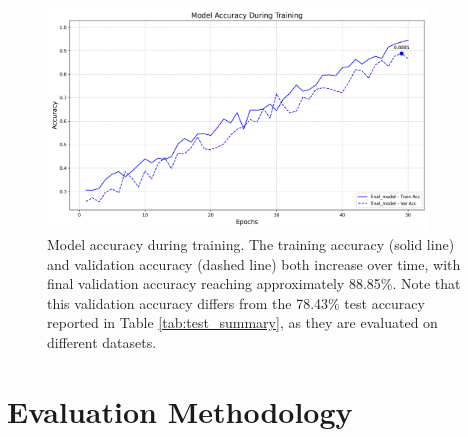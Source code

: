 \documentclass[10pt]{article}
\begin{document}
\begin{figure}[H]
    \centering
    \includegraphics[width=0.9\textwidth]{figures/accuracy_curves.png}
    \caption{Model accuracy during training. The training accuracy (solid line) and validation accuracy (dashed line) both increase over time, with final validation accuracy reaching approximately 88.85\%. Note that this validation accuracy differs from the 78.43\% test accuracy reported in Table \ref{tab:test_summary}, as they are evaluated on different datasets.}
    \label{fig:model_accuracy}
\end{figure}




\section{Evaluation Methodology}
\end{document}
